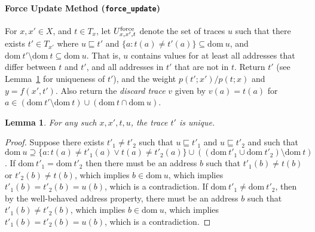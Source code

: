\documentclass{article}
\newtheorem{lemma}[theorem]{Lemma}
\newcommand{\code}[1]{\texttt{\small{\textbf{#1}}}}
\newcommand{\dom}[1]{\mbox{dom}{~#1}}
\newcommand{\force}[0]{\mbox{\scriptsize force}}
\newcommand{\contained}[0]{\sqsubseteq}
\begin{document}
\paragraph{Force Update Method (\code{force\_update})}
For $x, x' \in X$, and $t \in T_x$, let $U^{\force}_{x,x',t}$ denote the set of traces $u$ such that there exists $t' \in T_{x'}$ where $u \contained t'$ and $\{ a: t(a) \ne t'(a)\} \subseteq \dom{u}$, and $\dom{t'} \setminus \dom{t} \subseteq \dom{u}$.
That is, $u$ contains values for at least all addresses that differ between $t$ and $t'$, and all addresses in $t'$ that are not in $t$.
Return $t'$ (see Lemma~\ref{lemma:force-update-unique} for uniqueness of $t'$), and the weight $p(t'; x') / p(t; x)$ and $y = f(x', t')$.
Also return the \emph{discard trace} $v$ given by $v(a) = t(a)$ for $a \in (\dom{t'} \setminus \dom{t}) \cup (\dom{t} \cap \dom{u})$.

\begin{lemma} \label{lemma:force-update-unique}
For any such $x, x', t, u$, the trace $t'$ is unique.
\end{lemma}
\begin{proof}
Suppose there exists $t'_1 \ne t'_2$ such that $u \contained t'_1$ and $u \contained t'_2$ and such that $\dom{u} \supseteq \{a : t(a) \ne t'_1(a) \lor t(a) \ne t'_2(a)\} \cup ((\dom{t'_1} \cup \dom{t'_2}) \setminus \dom{t})$.
If $\dom{t'_1} = \dom{t'_2}$ then there must be an address $b$ such that $t'_1(b) \ne t(b)$ or $t'_2(b) \ne t(b)$, which implies $b \in \dom{u}$, which implies $t'_1(b) = t'_2(b) = u(b)$, which is a contradiction.
If $\dom{t'_1} \ne \dom{t'_2}$, then by the well-behaved address property, there must be an address $b$ such that $t'_1(b) \ne t'_2(b)$, which implies $b \in \dom{u}$, which implies $t'_1(b) = t'_2(b) = u(b)$, which is a contradiction.
\end{proof}
\end{document}
